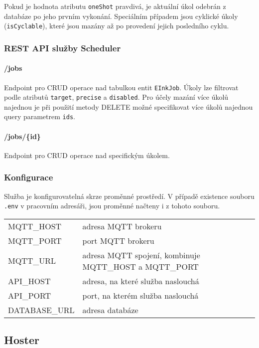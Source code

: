 Pokud je hodnota atributu \lstinline|oneShot| pravdivá, je aktuální úkol odebrán z databáze po jeho prvním vykonání. Speciálním případem jsou cyklické úkoly (\lstinline|isCyclable|), které jsou mazány až po provedení jejich posledního cyklu.

\subsubsection{REST API služby Scheduler}
\paragraph*{/jobs} Endpoint pro CRUD operace nad tabulkou entit \lstinline{EInkJob}. Úkoly lze filtrovat podle atributů \lstinline{target}, \lstinline{precise} a \lstinline{disabled}. Pro účely mazání více úkolů najednou je při použití metody DELETE možné specifikovat více úkolů najednou query parametrem \lstinline{ids}.
\paragraph*{/jobs/\{id\}} Endpoint pro CRUD operace nad specifickým úkolem.

\subsubsection{Konfigurace}
Služba je konfigurovatelná skrze proměnné prostředí. V případě existence souboru \lstinline|.env| v pracovním adresáři, jsou proměnné načteny i z tohoto souboru.

\begin{table}[h]
    \begin{tabular}{ll}
        MQTT\_HOST & adresa MQTT brokeru \\
        MQTT\_PORT & port MQTT brokeru \\
        MQTT\_URL & adresa MQTT spojení, kombinuje MQTT\_HOST a MQTT\_PORT \\
        API\_HOST & adresa, na které služba naslouchá \\
        API\_PORT & port, na kterém služba naslouchá \\
        DATABASE\_URL & adresa databáze \\
    \end{tabular}
\end{table}

\subsection{Hoster}

